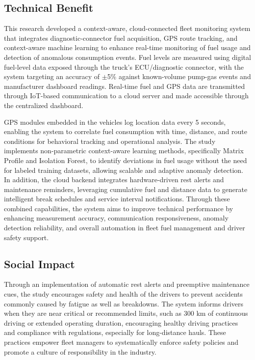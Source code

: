 \subsection{Technical Benefit}

This research developed a context-aware, cloud-connected fleet monitoring system that integrates diagnostic-connector fuel acquisition, GPS route tracking, and context-aware machine learning to enhance real-time monitoring of fuel usage and detection of anomalous consumption events. Fuel levels are measured using digital fuel-level data exposed through the truck's ECU/diagnostic connector, with the system targeting an accuracy of $\pm$5\% against known-volume pump-gas events and manufacturer dashboard readings. Real-time fuel and GPS data are transmitted through IoT-based communication to a cloud server and made accessible through the centralized dashboard.

GPS modules embedded in the vehicles log location data every 5 seconds, enabling the system to correlate fuel consumption with time, distance, and route conditions for behavioral tracking and operational analysis. The study implements non-parametric context-aware learning methods, specifically Matrix Profile and Isolation Forest, to identify deviations in fuel usage without the need for labeled training datasets, allowing scalable and adaptive anomaly detection. In addition, the cloud backend integrates hardware-driven rest alerts and maintenance reminders, leveraging cumulative fuel and distance data to generate intelligent break schedules and service interval notifications. Through these combined capabilities, the system aims to improve technical performance by enhancing measurement accuracy, communication responsiveness, anomaly detection reliability, and overall automation in fleet fuel management and driver safety support.

\subsection{Social Impact}

Through an implementation of automatic rest alerts and preemptive maintenance cues, the study encourages safety and health of the drivers to prevent accidents commonly caused by fatigue as well as breakdowns. The system informs drivers when they are near critical or recommended limits, such as 300 km of continuous driving or extended operating duration, encouraging healthy driving practices and compliance with regulations, especially for long-distance hauls. These practices empower fleet managers to systematically enforce safety policies and promote a culture of responsibility in the industry.

